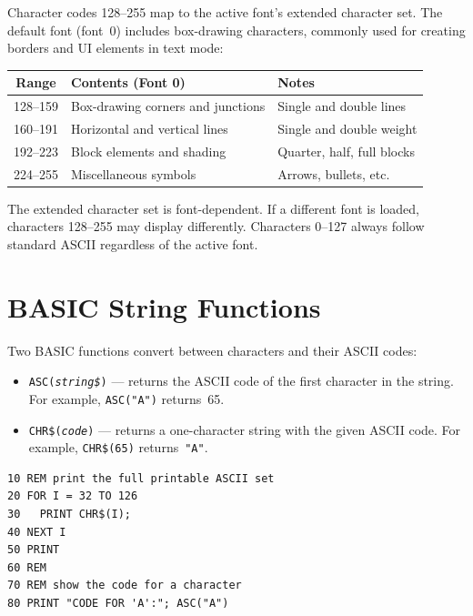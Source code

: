 Character codes 128--255 map to the active font's extended character set.  The
default font (font~0) includes box-drawing characters, commonly used for
creating borders and UI elements in text mode:

\begin{center}
\small
\begin{tabular}{@{}cll@{}}
\toprule
\textbf{Range} & \textbf{Contents (Font 0)} & \textbf{Notes} \\
\midrule
128--159 & Box-drawing corners and junctions & Single and double lines \\
160--191 & Horizontal and vertical lines     & Single and double weight \\
192--223 & Block elements and shading        & Quarter, half, full blocks \\
224--255 & Miscellaneous symbols             & Arrows, bullets, etc. \\
\bottomrule
\end{tabular}
\end{center}

\begin{notebox}
The extended character set is font-dependent.  If a different font is loaded,
characters 128--255 may display differently.  Characters 0--127 always follow
standard ASCII regardless of the active font.
\end{notebox}


\section{BASIC String Functions}
\label{sec:string-functions}

Two BASIC functions convert between characters and their ASCII codes:

\begin{itemize}
  \item \texttt{ASC(\textit{string\$})} --- returns the ASCII code of the first
        character in the string.  For example, \texttt{ASC("A")} returns~65.
  \item \texttt{CHR\$(\textit{code})} --- returns a one-character string with the
        given ASCII code.  For example, \texttt{CHR\$(65)} returns~\texttt{"A"}.
\end{itemize}

\begin{lstlisting}
10 REM print the full printable ASCII set
20 FOR I = 32 TO 126
30   PRINT CHR$(I);
40 NEXT I
50 PRINT
60 REM
70 REM show the code for a character
80 PRINT "CODE FOR 'A':"; ASC("A")
\end{lstlisting}
